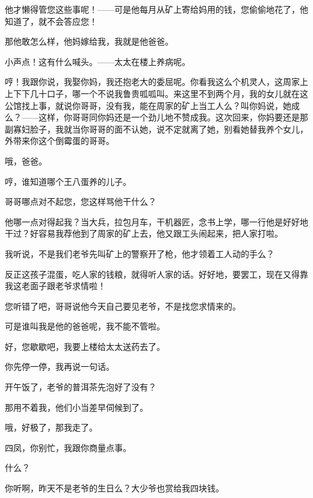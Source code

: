 他才懒得管您这些事呢！——可是他每月从矿上寄给妈用的钱，您偷偷地花了，他知道了，就不会答应您！

那他敢怎么样，他妈嫁给我，我就是他爸爸。

小声点！这有什么喊头。——太太在楼上养病呢。

哼！我跟你说，我娶你妈，我还抱老大的委屈呢。你看我这么个机灵人，这周家上上下下几十口子，哪一个不说我鲁贵呱呱叫。来这里不到两个月，我的女儿就在这公馆找上事，就说你哥哥，没有我，能在周家的矿上当工人么？叫你妈说，她成么？——这样，你哥哥同你妈还是一个劲儿地不赞成我。这次回来，你妈要还是那副寡妇脸子，我就当你哥哥的面不认她，说不定就离了她，别看她替我养个女儿，外带来你这个倒霉蛋的哥哥。

哦，爸爸。

哼，谁知道哪个王八蛋养的儿子。

哥哥哪点对不起您，您这样骂他干什么？

他哪一点对得起我？当大兵，拉包月车，干机器匠，念书上学，哪一行他是好好地干过？好容易我荐他到了周家的矿上去，他又跟工头闹起来，把人家打啦。

我听说，不是我们老爷先叫矿上的警察开了枪，他才领着工人动的手么？

反正这孩子混蛋，吃人家的钱粮，就得听人家的话。好好地，要罢工，现在又得靠我这老面子跟老爷求情啦！

您听错了吧，哥哥说他今天自己要见老爷，不是找您求情来的。

可是谁叫我是他的爸爸呢，我不能不管啦。

好，您歇歇吧，我要上楼给太太送药去了。

你先停一停，我再说一句话。

开午饭了，老爷的普洱茶先泡好了没有？

那用不着我，他们小当差早伺候到了。

哦，好极了，那我走了。

四凤，你别忙，我跟你商量点事。

什么？

你听啊，昨天不是老爷的生日么？大少爷也赏给我四块钱。

